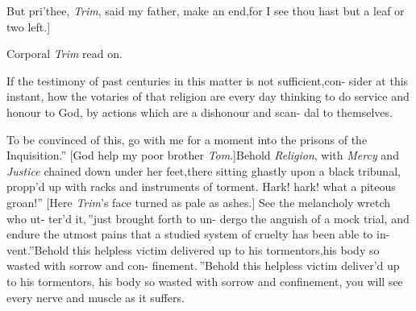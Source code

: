 \documentclass{article}
\begin{document}
But pri’thee, \textit{Trim}, said my father, make an end,\tsk for
I see thou hast but a leaf or two left.]

\vspace\parskip
\centerline{Corporal \textit{Trim} read on.}

\lqq If the testimony of past centuries\break
\lqq in this matter is not sufficient,\tsk con-\break
\lqq sider at this instant, how the votaries\break
\lqq of that religion are every day thinking\break
\lqq to do service and honour to God, by\break
\lqq actions which are a dishonour and scan-\break
\lqq dal to themselves.

\lqq To be convinced of this, go with\break
\lqq me for a moment into the prisons of\break
\lqq the Inquisition.” [God help my poor\break
brother \textit{Tom}.]\tsk \lqq Behold \textit{Religion},
with
\lqq \textit{Mercy} and \textit{Justice} chained down under\break
\lqq her feet,\tsh there sitting ghastly upon\break
\lqq a black tribunal, propp’d up with racks\break
\lqq and instruments of torment. Hark!\break
\lqq \tsk hark!  what a piteous groan!” [Here\break
\textit{Trim}’s face turned as pale as ashes.]\break
\lqq See the melancholy wretch who ut-\break
\lqq ter’d it,\,” \lqq just brought forth to un-\break
\lqq dergo the anguish of a mock trial, and\break
\lqq endure the utmost pains that a studied\break
\lqq system of cruelty has been able to in-\break
\lqq vent.”\tsk \lqq Behold this helpless victim\break
\lqq delivered up to his tormentors,\tsk his\break
\lqq body so wasted with sorrow and con-\break
\lqq finement.\,”\tsh \lqq Behold this helpless\break
\lqq victim deliver’d up to his tormentors,\break
\lqq \tsk his body so wasted with sorrow and\break
\lqq confinement, you will see every nerve\break
\lqq and muscle as it suffers.
\end{document}
